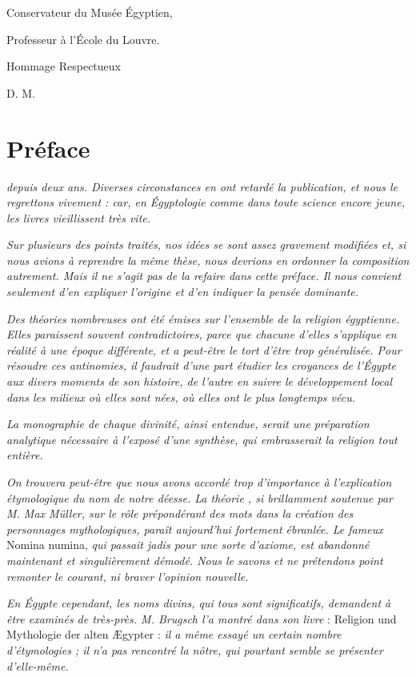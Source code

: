 \documentclass[letterpaper,twocolumn,openany,nodeprecatedcode]{dndbook}
\begin{document}
Conservateur du Musée Égyptien,

Professeur à l'École du Louvre.

Hommage Respectueux

D. M.
\vspace*{\fill}
\clearpage
\section*{Préface}
 \emph{depuis deux ans. Diverses circonstances en ont retardé la publication, et nous le regrettons vivement : car, en Égyptologie comme dans toute science encore jeune, les livres vieillissent très vite.}

\emph{Sur plusieurs des points traités, nos idées se sont assez gravement modifiées et, si nous avions à reprendre la même thèse, nous devrions en ordonner la composition autrement. Mais il ne s'agit pas de la refaire dans cette préface. Il nous convient seulement d'en expliquer l'origine et d'en indiquer la pensée dominante.}

\emph{Des théories nombreuses ont été émises sur l'ensemble de la religion égyptienne. Elles paraissent souvent contradictoires, parce que chacune d'elles s'applique en réalité à une époque différente, et a peut-être le tort d'être trop généralisée. Pour résoudre ces antinomies, il faudrait d'une part étudier les croyances de l'Égypte aux divers moments de son histoire, de l'autre en suivre le développement local dans les milieux où elles sont nées, où elles ont le plus longtemps vécu.}

\emph{La monographie de chaque divinité, ainsi entendue, serait une préparation analytique nécessaire à l'exposé d'une synthèse, qui embrasserait la religion tout entière.}

\emph{On trouvera peut-être que nous avons accordé trop d'importance à l'explication étymologique du nom de notre déesse. La théorie , si brillamment soutenue par M. Max Müller, sur le rôle prépondérant des mots dans la création des personnages mythologiques, paraît aujourd'hui fortement ébranlée. Le fameux} Nomina numina, \emph{qui passait jadis pour une sorte d'axiome, est abandonné maintenant et singulièrement démodé. Nous le savons et ne prétendons point remonter le courant, ni braver l'opinion nouvelle.}

\emph{En Égypte cependant, les noms divins, qui tous sont significatifs, demandent à être examinés de très-près. M. Brugsch l'a montré dans son livre} : Religion und Mythologie der alten Ægypter : \emph{il a même essayé un certain nombre d'étymologies ; il n'a pas rencontré la nôtre, qui pourtant semble se présenter d'elle-même.}
\end{document}
